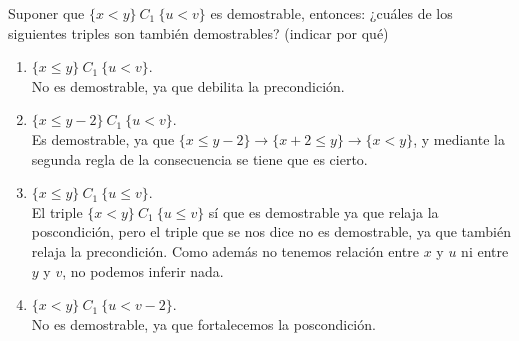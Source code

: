 \begin{ejercicio}
    Suponer que $\{x<y\}\ C_1\ \{u<v\}$ es demostrable, entonces: ¿cuáles de los siguientes triples son también demostrables? (indicar por qué)
    \begin{enumerate}
        \item $\{x\leq y\}\ C_1\ \{u<v\}$.\\
            No es demostrable, ya que debilita la precondición.
        \item $\{x\leq y-2\}\ C_1\ \{u<v\}$.\\
            Es demostrable, ya que $\{x\leq y-2\}\rightarrow\{x+2\leq y\}\rightarrow\{x<y\}$, y mediante la segunda regla de la consecuencia se tiene que es cierto.
        \item $\{x\leq y\}\ C_1\ \{u\leq v\}$.\\
            El triple $\{x<y\}\ C_1\ \{u\leq v\}$ sí que es demostrable ya que relaja la poscondición, pero el triple que se nos dice no es demostrable, ya que también relaja la precondición.
            Como además no tenemos relación entre $x$ y $u$ ni entre $y$ y $v$, no podemos inferir nada.
        \item $\{x<y\}\ C_1\ \{u<v-2\}$.\\
            No es demostrable, ya que fortalecemos la poscondición.
    \end{enumerate}
\end{ejercicio}

